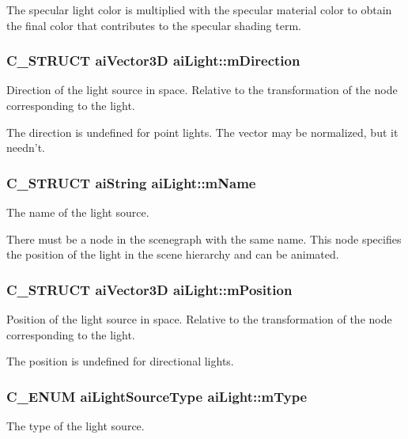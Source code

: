 The specular light color is multiplied with the specular material color to obtain the final color that contributes to the specular shading term. \hypertarget{structai_light_af3776d5e4e6065cb6dd7e10dc656dada}{
\subsubsection[{m\-Direction}]{\setlength{\rightskip}{0pt plus 5cm}C\-\_\-\-S\-T\-R\-U\-C\-T {\bf ai\-Vector3\-D} ai\-Light\-::m\-Direction}}\label{structai_light_af3776d5e4e6065cb6dd7e10dc656dada}
Direction of the light source in space. Relative to the transformation of the node corresponding to the light.

The direction is undefined for point lights. The vector may be normalized, but it needn't. \hypertarget{structai_light_a92806413f16230728b04e5f379fd00c0}{
\subsubsection[{m\-Name}]{\setlength{\rightskip}{0pt plus 5cm}C\-\_\-\-S\-T\-R\-U\-C\-T {\bf ai\-String} ai\-Light\-::m\-Name}}\label{structai_light_a92806413f16230728b04e5f379fd00c0}
The name of the light source.

There must be a node in the scenegraph with the same name. This node specifies the position of the light in the scene hierarchy and can be animated. \hypertarget{structai_light_a5daf9c9ad2613603b847a527123611f0}{
\subsubsection[{m\-Position}]{\setlength{\rightskip}{0pt plus 5cm}C\-\_\-\-S\-T\-R\-U\-C\-T {\bf ai\-Vector3\-D} ai\-Light\-::m\-Position}}\label{structai_light_a5daf9c9ad2613603b847a527123611f0}
Position of the light source in space. Relative to the transformation of the node corresponding to the light.

The position is undefined for directional lights. \hypertarget{structai_light_a4cba1741875dd92724ff55be91c60c2b}{
\subsubsection[{m\-Type}]{\setlength{\rightskip}{0pt plus 5cm}C\-\_\-\-E\-N\-U\-M {\bf ai\-Light\-Source\-Type} ai\-Light\-::m\-Type}}\label{structai_light_a4cba1741875dd92724ff55be91c60c2b}
The type of the light source.

